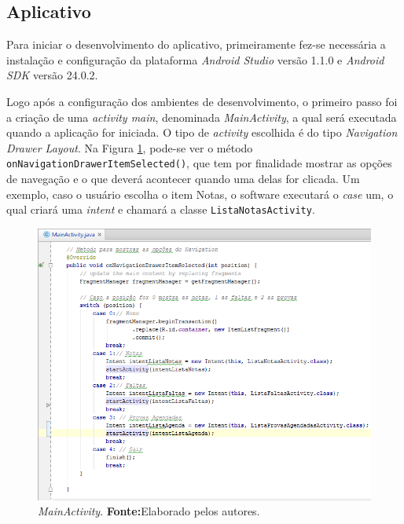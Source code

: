 \subsection{Aplicativo}

\par Para iniciar o desenvolvimento do aplicativo, primeiramente fez-se
necessária a instalação e configuração da plataforma \textit{Android Studio}
versão 1.1.0 e \textit{Android SDK} versão 24.0.2.

	\par Logo após a configuração dos ambientes de desenvolvimento, o primeiro
passo foi a criação de uma \textit{activity main}, denominada
\textit{MainActivity}, a qual será executada quando a aplicação for iniciada. O
tipo de \textit{activity} escolhida é do tipo \textit{Navigation Drawer
Layout}. Na Figura \ref{fig:qm4}, pode-se ver o método
\texttt{onNavigationDrawerItemSelected()}, que tem por finalidade mostrar as
opções de navegação e o que deverá acontecer quando uma delas for clicada. Um
exemplo, caso o usuário escolha o item Notas, o software executará o
\textit{case} um, o qual criará uma \textit{intent} e chamará a classe
\texttt{ListaNotasActivity}.
	
		\begin{figure}[h!]
			\centerline{\includegraphics[scale=0.4]{./imagens/2_q_metodologico/qm4.png}}
			\caption[\textit{MainActivity}]{\textit{MainActivity}.
			 \textbf{Fonte:}Elaborado pelos autores.}
			\label{fig:qm4}
		\end{figure}
		\pagebreak
		
